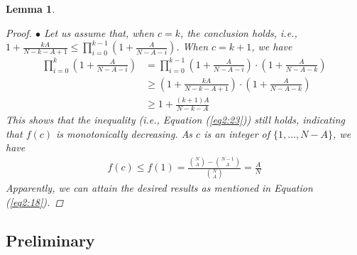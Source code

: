 \documentclass{article}
\theoremstyle{plain}
\newtheorem{lemma}[theorem]{Lemma}
\theoremstyle{definition}
\theoremstyle{remark}
\renewcommand{\eqref}[1]{Equation (\ref{#1})}
\begin{document}
\begin{lemma}
\begin{proof}
$\bullet$ Let us assume that, when $c = k$, the conclusion holds, i.e., $1 + \frac{kA}{N - k - A + 1} \leq \prod_{i=0}^{k-1} \left(1 + \frac{A}{N - A - i}\right)$. 
When $c = k+1$, we have 
\begin{align}
\prod_{i=0}^{k} \left(1 + \frac{A}{N - A - i}\right) &= \prod_{i=0}^{k-1} \left(1 + \frac{A}{N - A - i}\right) \cdot \left(1 + \frac{A}{N - A - k}\right)\\
&\geq \left(1 + \frac{kA}{N - k - A + 1}\right) \cdot \left(1 + \frac{A}{N - A - k}\right) \\
&\geq 1 + \frac{(k+1)A}{N - k - A}
\end{align}
This shows that the inequality (i.e., \eqref{eq2:23}) still holds, indicating that $f(c)$ is monotonically decreasing. As $c$ is an integer of $\{1, \dots, N-A\}$, we have
\begin{align}
    f(c) \leq f(1) = \frac{\binom{N}{A} - \binom{N - 1}{A}}{\binom{N}{A}} = \frac{A}{N}
\end{align}
Apparently, we can attain the desired results as mentioned in \eqref{eq2:18}. 
\end{proof}
\end{lemma}

\subsection{Preliminary} 
\end{document}
